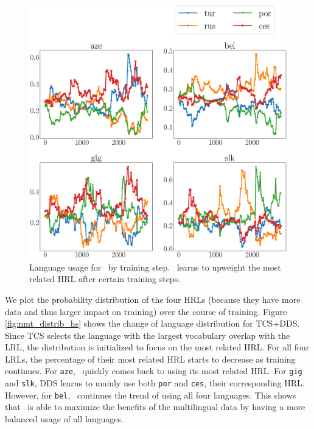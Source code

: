 \begin{figure}
    \centering
    \includegraphics[width=0.9\columnwidth]{figs/uniform_prob_plot.eps}
    \caption{\label{fig:nmt_distrib_uni}Language usage for \dds~by training step. \dds~learns to upweight the most related HRL after certain training steps.}
\end{figure}
We plot the probability distribution of the four HRLs (because they have more data and thus larger impact on training) over the course of training.  Figure \ref{fig:nmt_distrib_hs} shows the change of language distribution for TCS+DDS. Since TCS selects the language with the largest vocabulary overlap with the LRL, the distribution is initialized to focus on the most related HRL. For all four LRLs, the percentage of their most related HRL starts to decrease as training continues. For \texttt{aze}, \dds~quickly comes back to using its most related HRL. For \texttt{gig} and \texttt{slk}, DDS learns to mainly use both \texttt{por} and \texttt{ces}, their corresponding HRL. However, for \texttt{bel}, \dds~continues the trend of using all four languages. This shows that \dds~is able to maximize the benefits of the multilingual data by having a more balanced usage of all languages. 


